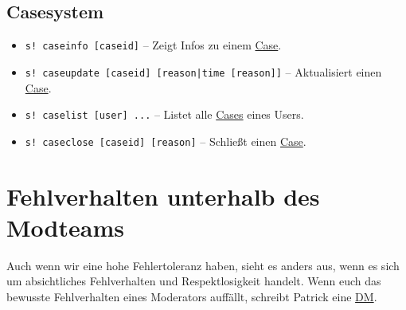 \documentclass[a4paper,12pt]{article}
\begin{document}
\subsection{Casesystem}
\label{sec:casesystem}
\begin{itemize}
    \item \texttt{s! caseinfo [caseid]} -- Zeigt Infos zu einem \hyperlink{term:case}{Case}.
    \item \texttt{s! caseupdate [caseid] [reason|time [reason]]} -- Aktualisiert einen \hyperlink{term:case}{Case}.
    \item \texttt{s! caselist [user] ...} -- Listet alle \hyperlink{term:case}{Cases} eines Users.
    \item \texttt{s! caseclose [caseid] [reason]} -- Schließt einen \hyperlink{term:case}{Case}.
\end{itemize}

\section{Fehlverhalten unterhalb des Modteams}
Auch wenn wir eine hohe Fehlertoleranz haben, sieht es anders aus, wenn es sich um absichtliches Fehlverhalten und Respektlosigkeit handelt.
Wenn euch das bewusste Fehlverhalten eines Moderators auffällt, schreibt Patrick eine \hyperlink{term:dm}{DM}.
\end{document}
